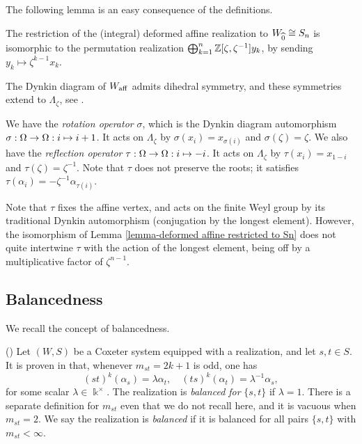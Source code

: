 The following lemma is an easy consequence of the definitions. 
\begin{lemma}\label{lemma-deformed affine restricted to Sn}
    The restriction of the (integral) deformed affine realization to $W_{\widehat{0}} \cong S_n$ is isomorphic to the permutation realization $\bigoplus_{k=1}^n\mathbb{Z}[\zeta,\zeta^{-1}]y_k$, by sending $y_k \mapsto \zeta^{k-1}x_k$. 
    
\end{lemma}



The Dynkin diagram of $W_{\operatorname{aff}}$ admits dihedral symmetry, and these symmetries extend to $\Lambda_{\zeta}$, see \cite[Definition 2.10]{EJY1}.

\begin{defn}We have the \emph{rotation operator} \label{defn-rotation operator}$\sigma$, which is the Dynkin diagram automorphism
$\sigma: \Omega \rightarrow \Omega: i \mapsto i+1$. 
It acts on $\Lambda_{\zeta}$ by $\sigma(x_i) = x_{\sigma(i)}$ and $\sigma(\zeta) = \zeta$.
We also have the \emph{reflection operator} \label{defn-reflection operator} $\tau: \Omega \rightarrow \Omega: i \mapsto -i$. It acts on $\Lambda_{\zeta}$ by $\tau(x_i) = x_{1-i}$ and $\tau(\zeta) = \zeta^{-1}$. 
Note that $\tau$ does not preserve the roots; it satisfies $\tau(\alpha_i) = -\zeta^{-1} \alpha_{\tau(i)}$. \end{defn}

Note that $\tau$ fixes the affine vertex, and acts on the finite Weyl group by its traditional Dynkin automorphism (conjugation by the longest element). However, the isomorphism of Lemma \ref{lemma-deformed affine restricted to Sn} does not quite intertwine $\tau$ with the action of the longest element, being off by a multiplicative factor of $\zeta^{n-1}$.





\subsection{Balancedness}
\label{subsec-balanced}
We recall the concept of balancedness.

\begin{defn} (\cite[Definition A.4]{ECathedral}) Let $(W,S)$ be a Coxeter system equipped with a realization, and let $s, t \in S$. It is proven in \cite[\S A.2]{ECathedral} that, whenever $m_{st} = 2k+1$ is odd, one has
\begin{equation} \label{eq:lambdadef} (st)^k(\alpha_s) = \lambda \alpha_t, \quad (ts)^k(\alpha_t) = \lambda^{-1} \alpha_s, \end{equation}
for some scalar $\lambda \in \Bbbk^\times$. The realization is \emph{balanced for} $\{s,t\}$ if $\lambda = 1$. There is a separate definition for $m_{st}$ even that we do not recall here, and it is vacuous when $m_{st} = 2$. We say the realization is \emph{balanced} if it is balanced for all pairs $\{s,t\}$ with $m_{st} < \infty$. \end{defn}

